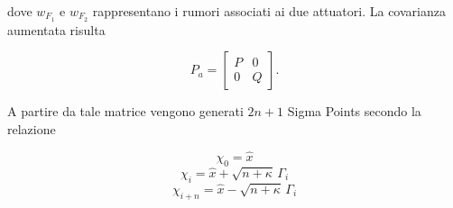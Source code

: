\documentclass[12pt,a4paper]{article}
\begin{document}
dove $w_{F_1}$ e $w_{F_2}$ rappresentano i rumori associati ai due attuatori.
La covarianza aumentata risulta

\begin{equation}
P_a =
\begin{bmatrix}
P & 0 \\
0 & Q
\end{bmatrix}.
\end{equation}

A partire da tale matrice vengono generati $2n+1$ Sigma Points secondo la relazione

\begin{equation}
\chi_0 = \hat{x}
\end{equation}
\begin{equation}
\chi_i = \hat{x} + \sqrt{n+\kappa} \, \Gamma_i
\end{equation}
\begin{equation}
\chi_{i+n} = \hat{x} - \sqrt{n+\kappa} \, \Gamma_i
\end{equation}
\end{document}
